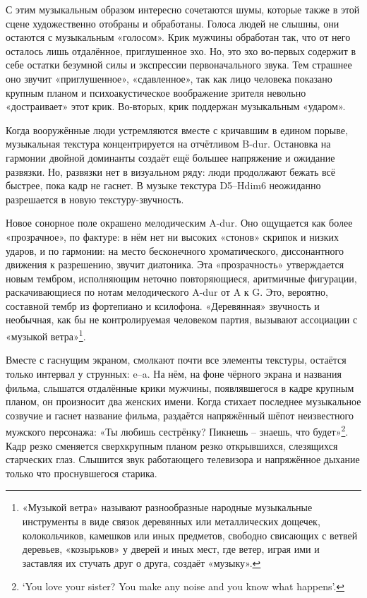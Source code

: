 С этим музыкальным образом интересно сочетаются шумы, которые также в этой сцене художественно отобраны и обработаны.
Голоса людей не слышны, они остаются с музыкальным «голосом».
Крик мужчины обработан так, что от него осталось лишь отдалённое, приглушенное эхо.
Но, это эхо во-первых содержит в себе остатки безумной силы и экспрессии первоначального звука.
Тем страшнее оно звучит «приглушенное», «сдавленное», так как лицо человека показано крупным планом и психоакустическое воображение зрителя невольно «достраивает» этот крик.
Во-вторых, крик поддержан музыкальным «ударом».

Когда вооружённые люди устремляются вместе с кричавшим в едином порыве, музыкальная текстура концентрируется на отчётливом B-dur.
Остановка на гармонии двойной доминанты создаёт ещё большее напряжение и ожидание развязки.
Но, развязки нет в визуальном ряду: люди продолжают бежать всё быстрее, пока кадр не гаснет.
В музыке текстура D5--Hdim6 неожиданно разрешается в новую текстуру-звучность.

Новое сонорное поле окрашено мелодическим A-dur.
Оно ощущается как более «прозрачное», по фактуре: в нём нет ни высоких «стонов» скрипок и низких ударов, и по гармонии: на место бесконечного хроматического, диссонантного движения к разрешению, звучит диатоника.
Эта «прозрачность» утверждается новым тембром, исполняющим неточно повторяющиеся, аритмичные фигурации, раскачивающиеся по нотам мелодического A-dur от A к G.
Это, вероятно, составной тембр из фортепиано и ксилофона.
«Деревянная» звучность и необычная, как бы не контролируемая человеком партия, вызывают ассоциации с «музыкой ветра»\footnote{«Музыкой ветра» называют разнообразные народные музыкальные инструменты в виде связок деревянных или металлических дощечек, колокольчиков, камешков или иных предметов, свободно свисающих с ветвей деревьев, «козырьков» у дверей и иных мест, где ветер, играя ими и заставляя их стучать друг о друга, создаёт «музыку».}.

Вместе с гаснущим экраном, смолкают почти все элементы текстуры, остаётся только интервал у струнных: e--a.
На нём, на фоне чёрного экрана и названия фильма, слышатся отдалённые крики мужчины, появлявшегося в кадре крупным планом, он произносит два женских имени.
Когда стихает последнее музыкальное созвучие и гаснет название фильма, раздаётся напряжённый шёпот неизвестного мужского персонажа: «Ты любишь сестрёнку? Пикнешь -- знаешь, что будет»\footnote{`You love your sister? You make any noise and you know what happens'.}.
Кадр резко сменяется сверхкрупным планом резко открывшихся, слезящихся старческих глаз.
Слышится звук работающего телевизора и напряжённое дыхание только что проснувшегося старика.

